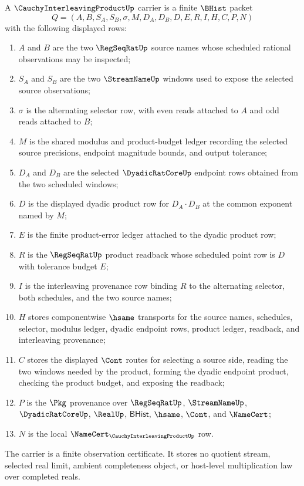 \begin{definition}
\label{def:cauchy-interleaving-product-carrier}
A $\CauchyInterleavingProductUp$ carrier is a finite $\BHist$ packet
$$
Q=(A,B,S_A,S_B,\sigma,M,D_A,D_B,D,E,R,I,H,C,P,N)
$$
with the following displayed rows:
\begin{enumerate}
\item $A$ and $B$ are the two $\RegSeqRatUp$ source names whose scheduled rational observations may be inspected;
\item $S_A$ and $S_B$ are the two $\StreamNameUp$ windows used to expose the selected source observations;
\item $\sigma$ is the alternating selector row, with even reads attached to $A$ and odd reads attached to $B$;
\item $M$ is the shared modulus and product-budget ledger recording the selected source precisions, endpoint magnitude bounds, and output tolerance;
\item $D_A$ and $D_B$ are the selected $\DyadicRatCoreUp$ endpoint rows obtained from the two scheduled windows;
\item $D$ is the displayed dyadic product row for $D_A \cdot D_B$ at the common exponent named by $M$;
\item $E$ is the finite product-error ledger attached to the dyadic product row;
\item $R$ is the $\RegSeqRatUp$ product readback whose scheduled point row is $D$ with tolerance budget $E$;
\item $I$ is the interleaving provenance row binding $R$ to the alternating selector, both schedules, and the two source names;
\item $H$ stores componentwise $\hsame$ transports for the source names, schedules, selector, modulus ledger, dyadic endpoint rows, product ledger, readback, and interleaving provenance;
\item $C$ stores the displayed $\Cont$ routes for selecting a source side, reading the two windows needed by the product, forming the dyadic endpoint product, checking the product budget, and exposing the readback;
\item $P$ is the $\Pkg$ provenance over $\RegSeqRatUp$, $\StreamNameUp$, $\DyadicRatCoreUp$, $\RealUp$, $\mathsf{BHist}$, $\hsame$, $\Cont$, and $\NameCert$;
\item $N$ is the local $\NameCert_{\CauchyInterleavingProductUp}$ row.
\end{enumerate}
The carrier is a finite observation certificate. It stores no quotient stream, selected real limit, ambient completeness object, or host-level multiplication law over completed reals.
\end{definition}

